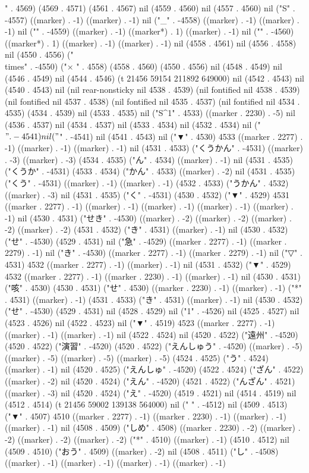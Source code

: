 " . 4569) (4569 . 4571) (4561 . 4567) nil (4559 . 4560) nil (4557 . 4560) nil ("S" . -4557) ((marker) . -1) ((marker) . -1) nil ("_" . -4558) ((marker) . -1) ((marker) . -1) nil ("{" . -4559) ((marker) . -1) ((marker*) . 1) ((marker) . -1) nil ("}" . -4560) ((marker*) . 1) ((marker) . -1) ((marker) . -1) nil (4558 . 4561) nil (4556 . 4558) nil (4550 . 4556) ("\\times" . -4550) ("×
" . 4558) (4558 . 4560) (4550 . 4556) nil (4548 . 4549) nil (4546 . 4549) nil (4544 . 4546) (t 21456 59154 211892 649000) nil (4542 . 4543) nil (4540 . 4543) nil (nil rear-nonsticky nil 4538 . 4539) (nil fontified nil 4538 . 4539) (nil fontified nil 4537 . 4538) (nil fontified nil 4535 . 4537) (nil fontified nil 4534 . 4535) (4534 . 4539) nil (4533 . 4535) nil ("S^{1}" . 4533) ((marker . 2230) . -5) nil (4536 . 4537) nil (4534 . 4537) nil (4533 . 4534) nil (4532 . 4534) nil ("$" . -4541) nil ("$" . -4541) nil (4541 . 4543) nil ("▼" . 4530) 4533 ((marker . 2277) . -1) ((marker) . -1) ((marker) . -1) nil (4531 . 4533) ("くうかん" . -4531) ((marker) . -3) ((marker) . -3) (4534 . 4535) ("ん" . 4534) ((marker) . -1) nil (4531 . 4535) ("くうか" . -4531) (4533 . 4534) ("かん" . 4533) ((marker) . -2) nil (4531 . 4535) ("くう" . -4531) ((marker) . -1) ((marker) . -1) (4532 . 4533) ("うかん" . 4532) ((marker) . -3) nil (4531 . 4535) ("く" . -4531) (4530 . 4532) ("▼" . 4529) 4531 ((marker . 2277) . -1) ((marker) . -1) ((marker) . -1) ((marker) . -1) ((marker) . -1) nil (4530 . 4531) ("せき" . -4530) ((marker) . -2) ((marker) . -2) ((marker) . -2) ((marker) . -2) (4531 . 4532) ("き" . 4531) ((marker) . -1) nil (4530 . 4532) ("せ" . -4530) (4529 . 4531) nil ("急" . -4529) ((marker . 2277) . -1) ((marker . 2279) . -1) nil ("き" . -4530) ((marker . 2277) . -1) ((marker . 2279) . -1) nil ("▽" . 4531) 4532 ((marker . 2277) . -1) ((marker) . -1) nil (4531 . 4532) ("▼" . 4529) 4532 ((marker . 2277) . -1) ((marker . 2230) . -1) ((marker) . -1) nil (4530 . 4531) ("咳" . 4530) (4530 . 4531) ("せ" . 4530) ((marker . 2230) . -1) ((marker) . -1) ("*" . 4531) ((marker) . -1) (4531 . 4533) ("き" . 4531) ((marker) . -1) nil (4530 . 4532) ("せ" . -4530) (4529 . 4531) nil (4528 . 4529) nil ("1" . -4526) nil (4525 . 4527) nil (4523 . 4526) nil (4522 . 4523) nil ("▼" . 4519) 4523 ((marker . 2277) . -1) ((marker) . -1) ((marker) . -1) nil (4522 . 4524) nil (4520 . 4522) ("遠州" . -4520) (4520 . 4522) ("演習" . -4520) (4520 . 4522) ("えんしゅう" . -4520) ((marker) . -5) ((marker) . -5) ((marker) . -5) ((marker) . -5) (4524 . 4525) ("う" . 4524) ((marker) . -1) nil (4520 . 4525) ("えんしゅ" . -4520) (4522 . 4524) ("ざん" . 4522) ((marker) . -2) nil (4520 . 4524) ("えん" . -4520) (4521 . 4522) ("んざん" . 4521) ((marker) . -3) nil (4520 . 4524) ("え" . -4520) (4519 . 4521) nil (4514 . 4519) nil (4512 . 4514) (t 21456 59002 139138 564000) nil (" " . -4512) nil (4509 . 4513) ("▼" . 4507) 4510 ((marker . 2277) . -1) ((marker . 2230) . -1) ((marker) . -1) ((marker) . -1) nil (4508 . 4509) ("しめ" . 4508) ((marker . 2230) . -2) ((marker) . -2) ((marker) . -2) ((marker) . -2) ("*" . 4510) ((marker) . -1) (4510 . 4512) nil (4509 . 4510) ("おう" . 4509) ((marker) . -2) nil (4508 . 4511) ("し" . -4508) ((marker) . -1) ((marker) . -1) ((marker) . -1) ((marker) . -1) 